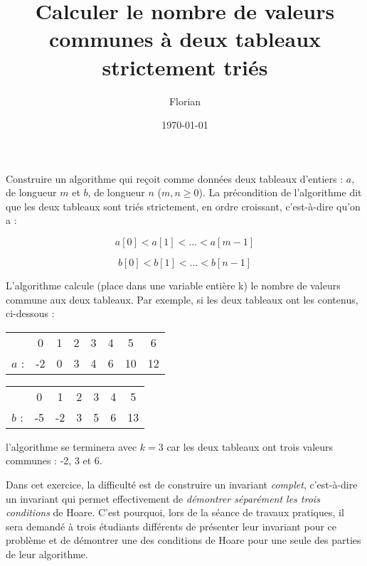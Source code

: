 \documentclass[a4paper, 12pt]{article}
\author{Florian \bsc{Thuin}}
\title{Calculer le nombre de valeurs communes à deux tableaux strictement triés}
\date{\today}
\begin{document}
\maketitle
     
      Construire un algorithme qui reçoit comme données deux tableaux d'entiers : $a$, de longueur $m$ et $b$, de longueur $n$ ($m,n \ge 0$). La précondition de l'algorithme dit que les deux tableaux sont triés strictement, en ordre croissant, c'est-à-dire qu'on a :
      
      \[
       a[0] < a[1] < ... < a[m-1]
      \]
      
      \[
       b[0] < b[1] < ... < b[n-1]
      \]
      
      L'algorithme calcule (place dans une variable entière k) le nombre de valeurs commune aux deux tableaux. Par exemple, si les deux tableaux ont les contenus, ci-dessous :
      
      \begin{center}
      \begin{tabular}{lccccccc}
      & 0 & 1 & 2 & 3 & 4 & 5 & 6 \\ \cline{2-8}
      $a$ : & \multicolumn{1}{|c|}{-2} & \multicolumn{1}{c|}{0} & \multicolumn{1}{c|}{3} & \multicolumn{1}{c|}{4} & \multicolumn{1}{c|}{6} & \multicolumn{1}{c|}{10} & \multicolumn{1}{c|}{12} \\ \cline{2-8}
      \end{tabular}
      \end{center}
      
      \begin{center}
      \begin{tabular}{lcccccc}
       & 0 & 1 & 2 & 3 & 4 & 5 \\ \cline{2-7}
      $b$ : & \multicolumn{1}{|c|}{-5} & \multicolumn{1}{c|}{-2} & \multicolumn{1}{c|}{3} & \multicolumn{1}{c|}{5} & \multicolumn{1}{c|}{6} & \multicolumn{1}{c|}{13} \\ \cline{2-7}
      \end{tabular}
      \end{center}
      
      l'algorithme se terminera avec $k=3$ car les deux tableaux ont trois valeurs communes : -2, 3 et 6.
      
      Dans cet exercice, la difficulté est de construire un invariant \textit{complet}, c'est-à-dire un invariant qui permet effectivement de \emph{démontrer séparément les trois conditions} de Hoare. C'est pourquoi, lors de la séance de travaux pratiques, il sera demandé à trois étudiants différents de présenter leur invariant pour ce problème et de démontrer une des conditions de Hoare pour une seule des parties de leur algorithme.
\end{document}
